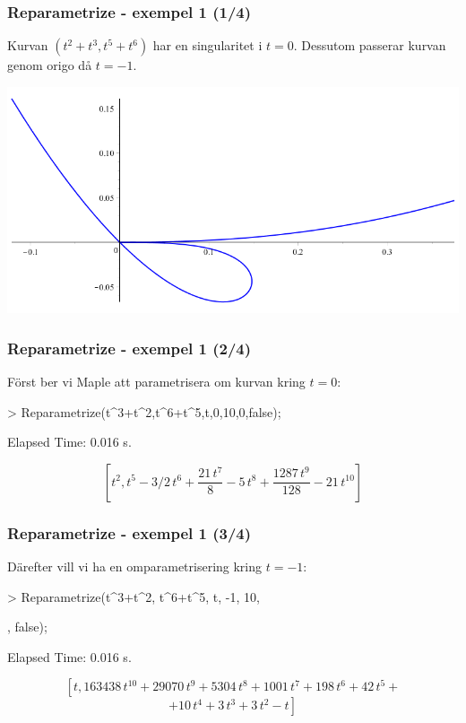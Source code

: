 \documentclass{beamer}
\begin{document}
\begin{frame}
	\frametitle{Reparametrize - exempel 1 (1/4)}
	
  	\begin{example}
  		Kurvan $(t^2+t^3,t^5+t^6)$ har en singularitet i $t = 0$. Dessutom passerar kurvan genom origo då $t = -1$.
  		
		\begin{center}
			\includegraphics[scale=0.35]{Export/kurvorplot2d1_0.png}
		\end{center}
  	\end{example}
\end{frame}
  		
\begin{frame}
	\frametitle{Reparametrize - exempel 1 (2/4)}
	
	\begin{example}
  		Först ber vi Maple att parametrisera om kurvan kring $t = 0$:
  		
		\begin{semiverbatim}
		> Reparametrize(t\^{}3+t\^{}2,t\^{}6+t\^{}5,t,0,10,0,false);
		
		
		Elapsed Time: 0.016 s.
		\end{semiverbatim}
				 
		 \[\left[{t}^{2},{t}^{5}-3/2\,{t}^{6}+{\frac {21\,{t}^{7}}{8}}-5\,{t}^{8}+{\frac {1287\,{t}^{9}}{128}}-21\,{t}^{10}\right]\]
  	\end{example}
\end{frame}

\begin{frame}
	\frametitle{Reparametrize - exempel 1 (3/4)}
	
	\begin{example}
		Därefter vill vi ha en omparametrisering kring $t = -1$:

\begin{semiverbatim}
> Reparametrize(t\^{}3+t\^{}2, t\^{}6+t\^{}5, t, -1, 10,

, false);


Elapsed Time: 0.016 s.
\end{semiverbatim}		
		\[\left[t,163438\,{t}^{10}+29070\,{t}^{9}+5304\,{t}^{8}+1001\,{t}^{7}+198\,{t}^{6}+42\,{t}^{5}+\right.\]
		\[\left.+10\,{t}^{4}+3\,{t}^{3}+3\,{t}^{2}-t\right]\]
	\end{example}
\end{frame}
\end{document}
